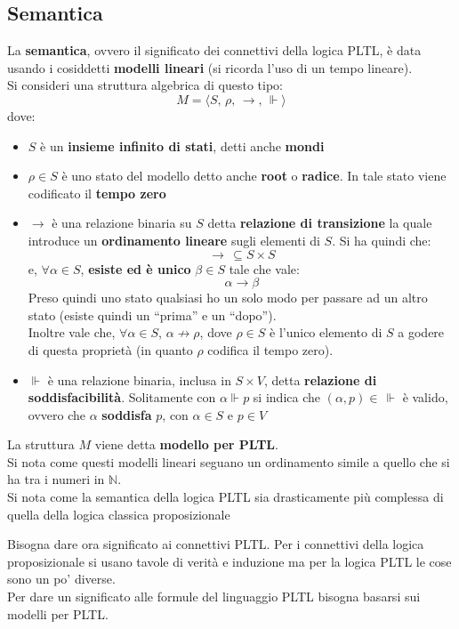 \documentclass[a4paper,12pt, oneside]{book}
\begin{document}
\subsection{Semantica}
\begin{definizione}
  La \textbf{semantica}, ovvero il significato dei connettivi della logica PLTL,
  è data usando i cosiddetti \textbf{modelli lineari} (si ricorda l'uso di un
  tempo lineare).\\
  Si consideri una struttura algebrica di questo tipo:
  \[M=\langle S,\,\rho, \,\to, \,\Vdash\rangle\]
  dove:
  \begin{itemize}
    \item $S$ è un \textbf{insieme infinito di stati}, detti anche
    \textbf{mondi}
    \item $\rho \in S$ è uno stato del modello detto anche \textbf{root} o
    \textbf{radice}. In tale stato viene codificato il \textbf{tempo zero}
    \item $\to$ è una relazione binaria su $S$ detta \textbf{relazione di
      transizione} la quale introduce un \textbf{ordinamento lineare} sugli
    elementi di $S$. Si ha quindi che:
    \[\to\,\subseteq S\times S\]
    e, $\forall \alpha \in S$, \textbf{esiste ed è unico} $\beta\in S$ tale che
    vale:
    \[\alpha\to\beta\]
    Preso quindi uno stato qualsiasi ho un solo modo per passare ad un altro
    stato (esiste quindi un ``prima'' e un ``dopo'').\\
    Inoltre vale che, $\forall \alpha\in S$, $\alpha\not\to \rho$, dove $\rho\in
    S$ è l'unico elemento di $S$ a godere di questa proprietà (in quanto $\rho$
    codifica il tempo zero). 
    \item $\Vdash$ è una relazione binaria, inclusa in $S\times V$, detta
    \textbf{relazione di soddisfacibilità}. Solitamente con $\alpha\Vdash p$
    si indica che $(\alpha,p)\in\,\Vdash$ è valido, ovvero che $\alpha$
    \textbf{soddisfa} $p$, con $\alpha\in S$ e $p\in V$
  \end{itemize}
  La struttura $M$ viene detta \textbf{modello per PLTL}.\\
  Si nota come questi modelli lineari seguano un ordinamento simile a quello che
  si ha tra i numeri in $\mathbb{N}$.\\ 
  Si nota come la semantica della logica PLTL sia drasticamente più complessa
  di quella della logica classica proposizionale 
\end{definizione}

Bisogna dare ora significato ai connettivi PLTL. Per i connettivi della logica
proposizionale si usano tavole di verità e induzione ma per la logica PLTL le
cose sono un po' diverse.\\
Per dare un significato alle formule del linguaggio PLTL bisogna basarsi sui
modelli per PLTL.\\
\end{document}
